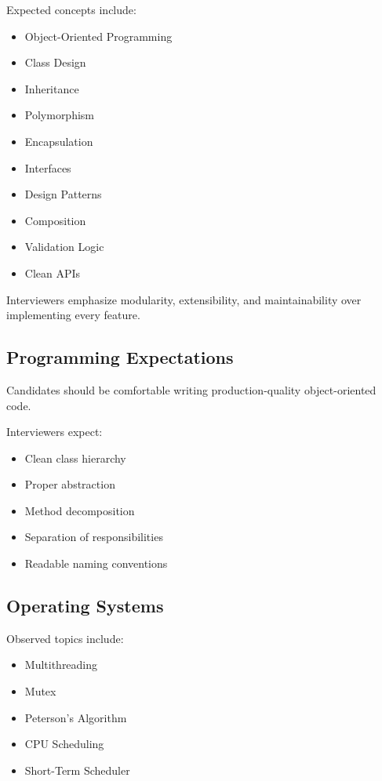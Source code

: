 \documentclass[11pt,a4paper]{article}
\begin{document}
Expected concepts include:

\begin{itemize}
	\item Object-Oriented Programming
	\item Class Design
	\item Inheritance
	\item Polymorphism
	\item Encapsulation
	\item Interfaces
	\item Design Patterns
	\item Composition
	\item Validation Logic
	\item Clean APIs
\end{itemize}

Interviewers emphasize modularity, extensibility, and maintainability over implementing every feature.


\subsection{Programming Expectations}

Candidates should be comfortable writing production-quality object-oriented code.

Interviewers expect:

\begin{itemize}
	\item Clean class hierarchy
	\item Proper abstraction
	\item Method decomposition
	\item Separation of responsibilities
	\item Readable naming conventions
\end{itemize}


\subsection{Operating Systems}

Observed topics include:

\begin{itemize}
	\item Multithreading
	\item Mutex
	\item Peterson's Algorithm
	\item CPU Scheduling
	\item Short-Term Scheduler
\end{itemize}
\end{document}
